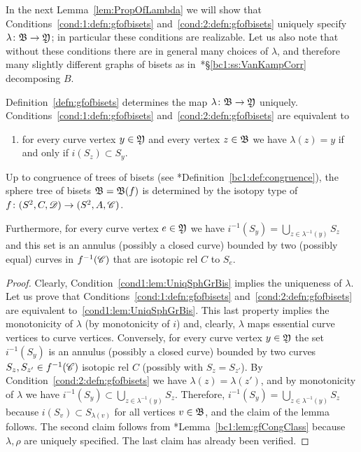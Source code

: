 \documentclass{amsart}
\begin{document}
In the next Lemma~\ref{lem:PropOfLambda} we will show that
Conditions~\eqref{cond:1:defn:gfofbisets}
and~\eqref{cond:2:defn:gfofbisets} uniquely specify
$\lambda \colon {\mathfrak B} \to {\mathfrak Y}$; in particular these
conditions are realizable. Let us also note that without these
conditions there are in general many choices of $\lambda$, and
therefore many slightly different graphs of bisets as
in~\cite{bartholdi-dudko:bc1}*{\S\ref{bc1:ss:VanKampCorr}} decomposing
$B$.

\begin{lem}\label{lem:UniqSphGrBis}
  Definition~\ref{defn:gfofbisets} determines the map $\lambda \colon
  {\mathfrak B}\to {\mathfrak Y}$ uniquely. Conditions~\eqref{cond:1:defn:gfofbisets}
  and~\eqref{cond:2:defn:gfofbisets} are equivalent to 
  \begin{enumerate}\renewcommand\theenumi{TB'\ensuremath}
  \item for every curve vertex $y\in {\mathfrak Y}$ and every vertex
    $z\in {\mathfrak B}$ we have $\lambda(z)=y$ if and only if
    $i(S_z)\subset S_y$.\label{cond1:lem:UniqSphGrBis}
  \end{enumerate}
  Up to congruence of trees of bisets (see
  \cite{bartholdi-dudko:bc1}*{Definition~\ref{bc1:def:congruence}}),
  the sphere tree of bisets ${\mathfrak B}={\mathfrak B}(f)$ is determined by the
  isotopy type of $f\colon(S^2,C,{\mathscr D})\to(S^2,A,{\mathscr C})$.
  
  Furthermore, for every curve vertex $e\in {\mathfrak Y}$ we have
  $i^{-1}(S_y)= \bigcup_{z\in \lambda^{-1}(y)}S_z$ and this set is an
  annulus (possibly a closed curve) bounded by two (possibly equal)
  curves in $ f^{-1}({\mathscr C})$ that are isotopic rel $C$ to $S_e$.
\end{lem}
\begin{proof}
  Clearly, Condition~\eqref{cond1:lem:UniqSphGrBis} implies the
  uniqueness of $\lambda$. Let us prove that
  Conditions~\eqref{cond:1:defn:gfofbisets}
  and~\eqref{cond:2:defn:gfofbisets} are equivalent
  to~\eqref{cond1:lem:UniqSphGrBis}. This last property implies the
  monotonicity of $\lambda$ (by monotonicity of $i$) and, clearly,
  $\lambda$ maps essential curve vertices to curve
  vertices. Conversely, for every curve vertex $y\in {\mathfrak Y}$ the set
  $i^{-1}(S_y)$ is an annulus (possibly a closed curve) bounded by two
  curves $S_{z}, S_{z'}\in f^{-1}({\mathscr C})$ isotopic rel $C$ (possibly
  with $S_{z}=S_{z'}$). By Condition~\eqref{cond:2:defn:gfofbisets} we
  have $\lambda(z)=\lambda(z')$, and by monotonicity of $\lambda$ we
  have $i^{-1}(S_y)\subset \bigcup_{z\in
    \lambda^{-1}(y)}S_z$. Therefore,
  $i^{-1}(S_y)= \bigcup_{z\in \lambda^{-1}(y)}S_z$ because
  $i(S_v)\subset S_{\lambda(v)}$ for all vertices $v\in{\mathfrak B}$, and the
  claim of the lemma follows.  The second claim follows from
  \cite{bartholdi-dudko:bc1}*{Lemma~\ref{bc1:lem:gfCongClass}} because
  $\lambda,\rho$ are uniquely specified. The last claim has already
  been verified.
\end{proof}
\end{document}
